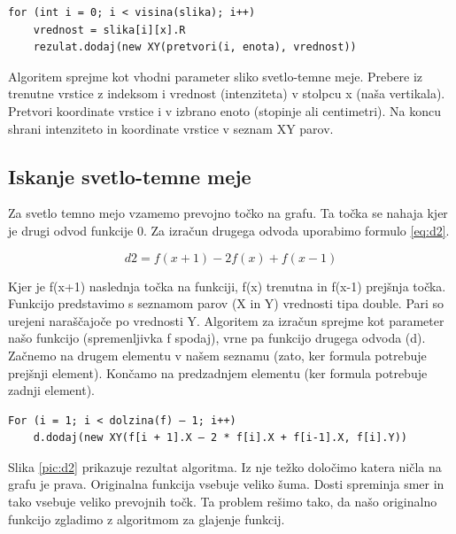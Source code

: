 \documentclass[oneside, a4paper, 12pt]{book}
\begin{document}
\begin{verbatim}
for (int i = 0; i < visina(slika); i++)
    vrednost = slika[i][x].R
    rezulat.dodaj(new XY(pretvori(i, enota), vrednost))
\end{verbatim}

Algoritem sprejme kot vhodni parameter sliko svetlo-temne meje. Prebere iz trenutne vrstice z indeksom i vrednost (intenziteta) v stolpcu x (naša vertikala). Pretvori koordinate vrstice i v izbrano enoto (stopinje ali centimetri). Na koncu shrani intenziteto in koordinate vrstice v seznam XY parov.

\subsection{Iskanje svetlo-temne meje}
Za svetlo temno mejo vzamemo prevojno točko na grafu. Ta točka se nahaja kjer je drugi odvod funkcije 0. Za izračun drugega odvoda uporabimo formulo \ref{eq:d2}.

\begin{equation}
d2=f(x+1) - 2f(x) + f(x-1)
\label{eq:d2}
\end{equation}

Kjer je f(x+1) naslednja točka na funkciji, f(x) trenutna in f(x-1) prejšnja točka. Funkcijo predstavimo s seznamom parov (X in Y) vrednosti tipa double. Pari so urejeni naraščajoče po vrednosti Y. Algoritem za izračun sprejme kot parameter našo funkcijo (spremenljivka f spodaj), vrne pa funkcijo drugega odvoda (d). Začnemo na drugem elementu v našem seznamu (zato, ker formula potrebuje prejšnji element). Končamo na predzadnjem elementu (ker formula potrebuje zadnji element).

\begin{verbatim}
For (i = 1; i < dolzina(f) – 1; i++) 
    d.dodaj(new XY(f[i + 1].X – 2 * f[i].X + f[i-1].X, f[i].Y))
\end{verbatim}

Slika \ref{pic:d2} prikazuje rezultat algoritma. Iz nje težko določimo katera ničla na grafu je prava. Originalna funkcija vsebuje veliko šuma. Dosti spreminja smer in tako vsebuje veliko prevojnih točk. Ta problem rešimo tako, da našo originalno funkcijo zgladimo z algoritmom za glajenje funkcij.
\end{document}
